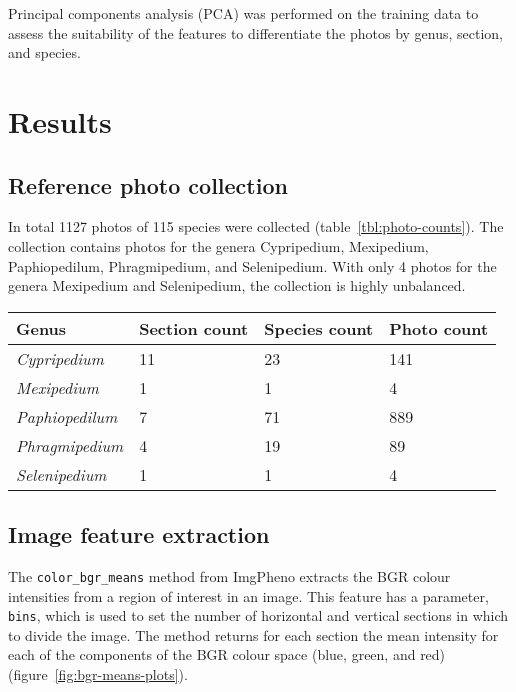 \documentclass[review,3p,twocolumn]{elsarticle}
\begin{document}
Principal components analysis (PCA) was performed on the training data to assess the suitability of the features to differentiate the photos by genus, section, and species.

\section{Results}
\label{sect:results}

\subsection{Reference photo collection}

In total 1127 photos of 115 species were collected (table~\ref{tbl:photo-counts}). The collection contains photos for the genera Cypripedium, Mexipedium, Paphiopedilum, Phragmipedium, and Selenipedium. With only 4 photos for the genera Mexipedium and Selenipedium, the collection is highly unbalanced.

\begin{table*}[t]\footnotesize
    \caption{The number of photos collected per genus, as well as the number of sections and species per genus represented by the photo collection. A total of 1127 photos of 115 species were collected.}
    \begin{center}
    \begin{tabular}{llll}
    \toprule
    \textbf{Genus} & \textbf{Section count} & \textbf{Species count} & \textbf{Photo count} \\
    \midrule
    \textit{Cypripedium} & 11 & 23 & 141 \\
    \textit{Mexipedium} & 1 & 1 & 4 \\
    \textit{Paphiopedilum} & 7 & 71 & 889 \\
    \textit{Phragmipedium} & 4 & 19 & 89 \\
    \textit{Selenipedium} & 1 & 1 & 4 \\
    \bottomrule
    \end{tabular}
    \end{center}
    \label{tbl:photo-counts}
\end{table*}

\subsection{Image feature extraction}

The \verb/color_bgr_means/ method from ImgPheno extracts the BGR colour intensities from a region of interest in an image. This feature has a parameter, \verb/bins/, which is used to set the number of horizontal and vertical sections in which to divide the image. The method returns for each section the mean intensity for each of the components of the BGR colour space (blue, green, and red) (figure~\ref{fig:bgr-means-plots}).
\end{document}
